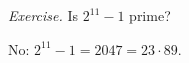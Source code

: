 \noindent\textit{Exercise.} Is $2^{11} - 1$ prime?
\begin{webhint}
No: $2^{11} - 1 = 2047 = 23 \cdot 89$.
\end{webhint}
